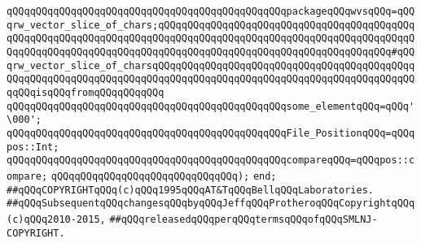 \verb|qQQqqQQqqQQqqQQqqQQqqQQqqQQqqQQqqQQqqQQqqQQqqQQqpackageqQQqwvsqQQq=qQQqrw_vector_slice_of_chars;qQQqqQQqqQQqqQQqqQQqqQQqqQQqqQQqqQQqqQQqqQQqqQQqqQQqqQQqqQQqqQQqqQQqqQQqqQQqqQQqqQQqqQQqqQQqqQQqqQQqqQQqqQQqqQQqqQQqqQQqqQQqqQQqqQQqqQQqqQQqqQQqqQQqqQQqqQQqqQQqqQQqqQQqqQQqqQQqqQQq#qQQqrw_vector_slice_of_charsqQQqqQQqqQQqqQQqqQQqqQQqqQQqqQQqqQQqqQQqqQQqqQQqqQQqqQQqqQQqqQQqqQQqqQQqqQQqqQQqqQQqqQQqqQQqqQQqqQQqqQQqqQQqqQQqqQQqqQQqisqQQqfromqQQqqQQqqQQq|\newline
\newline
\verb|qQQqqQQqqQQqqQQqqQQqqQQqqQQqqQQqqQQqqQQqqQQqqQQqsome_elementqQQq=qQQq'\000';|\newline
\newline
\verb|qQQqqQQqqQQqqQQqqQQqqQQqqQQqqQQqqQQqqQQqqQQqqQQqFile_PositionqQQq=qQQqpos::Int;|\newline
\newline
\verb|qQQqqQQqqQQqqQQqqQQqqQQqqQQqqQQqqQQqqQQqqQQqqQQqcompareqQQq=qQQqpos::compare;|\newline
\verb|qQQqqQQqqQQqqQQqqQQqqQQqqQQqqQQq);|\newline
\verb|end;|\newline
\newline
\newline
\verb|##qQQqCOPYRIGHTqQQq(c)qQQq1995qQQqAT&TqQQqBellqQQqLaboratories.|\newline
\verb|##qQQqSubsequentqQQqchangesqQQqbyqQQqJeffqQQqProtheroqQQqCopyrightqQQq(c)qQQq2010-2015,|\newline
\verb|##qQQqreleasedqQQqperqQQqtermsqQQqofqQQqSMLNJ-COPYRIGHT.|\newline

